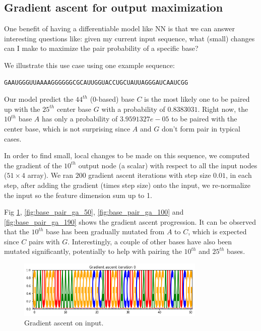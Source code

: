 \documentclass{proposal}
\begin{document}

\subsection{Gradient ascent for output maximization}

One benefit of having a differentiable model like NN is that we can answer interesting questions like:
given my current input sequence, what (small) changes can I make to maximize the pair probability of a specific base?

We illustrate this use case using one example sequence:

\begin{verbatim}
GAAUGGGUUAAAAGGGGGGCGCAUUGGUACCUGCUAUUAGGGAUCAAUCGG
\end{verbatim}

Our model predict the $44^{th}$ (0-based) base $C$ is the most
likely one to be paired up with the $25^{th}$ center base $G$ with a probability of $0.8383031$.
Right now, the $10^{th}$ base $A$ has only a probability of $3.9591327e-05$ to be paired with the center base,
which is not surprising since $A$ and $G$ don't form pair in typical cases.


In order to find small, local changes to be made on this sequence,
we computed the gradient of the $10^{th}$ output node (a scalar) with respect to all the input nodes ($51 \times 4$ array).
We ran $200$ gradient ascent iterations with step size $0.01$,
in each step, after adding the gradient (times step size) onto the input,
we re-normalize the input so the feature dimension sum up to 1.

Fig \ref{fig:base_pair_ga_0}, \ref{fig:base_pair_ga_50}, \ref{fig:base_pair_ga_100} and \ref{fig:base_pair_ga_190}
shows the gradient ascent progression.
It can be observed that the $10^{th}$ base has been gradually mutated from $A$ to $C$, which is expected since $C$ pairs with $G$.
Interestingly, a couple of other bases have also been mutated significantly, potentially to help with pairing the $10^{th}$ and $25^{th}$ bases.


\begin{figure}[h!]
    \centering
    \includegraphics[width=0.8\textwidth]{plot/base_pair_ga_0.png}
    \caption{Gradient ascent on input.}
    \label{fig:base_pair_ga_0}
    \centering
\end{figure}
\end{document}
